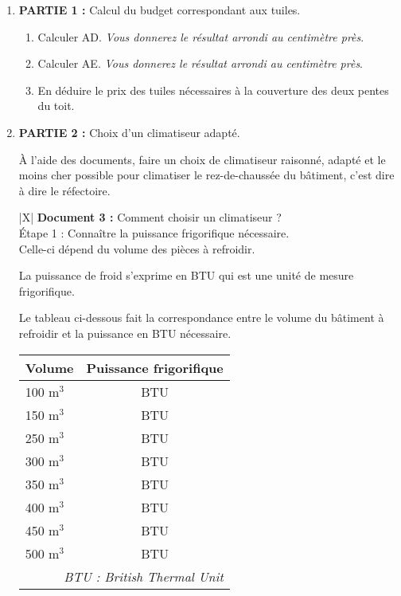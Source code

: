\begin{enumerate}
\item \textbf{PARTIE 1 :} Calcul du budget correspondant aux tuiles.
\smallskip

	\begin{enumerate}
		\item Calculer AD. \emph{Vous donnerez le résultat arrondi au centimètre près}.
		\item Calculer AE. \emph{Vous donnerez le résultat arrondi au centimètre près}.
		\item En déduire le prix des tuiles nécessaires à la couverture des deux pentes du toit.
 	\end{enumerate}
\item  \textbf{PARTIE 2 :} Choix d'un climatiseur adapté.
\smallskip

À l'aide des documents, faire un choix de climatiseur raisonné, adapté et le moins cher
possible pour climatiser le rez-de-chaussée du bâtiment, c'est dire à dire le réfectoire.
	
\begin{center}
\begin{tabularx}{\linewidth}{|X|}\hline	
\textbf{Document 3 :} Comment choisir un climatiseur ?\\[4pt]
Étape 1 : Connaître la puissance frigorifique nécessaire.\\[4pt]

Celle-ci dépend du volume des pièces à refroidir.

La puissance de froid s'exprime en BTU qui est une unité de mesure frigorifique.

Le tableau ci-dessous fait la correspondance entre le volume du bâtiment à refroidir et la
puissance en BTU nécessaire.

\begin{center}
\begin{tabular}{|m{2cm}|c|}\hline
Volume 		&Puissance frigorifique\\ \hline
100 m$^3$ 	&\np{12000} BTU\\ \hline
150 m$^3$ 	&\np{18000} BTU\\ \hline
250 m$^3$ 	&\np{25000} BTU\\ \hline
300 m$^3$ 	&\np{33000} BTU\\ \hline
350 m$^3$ 	&\np{41000} BTU\\ \hline
400 m$^3$ 	&\np{49000} BTU\\ \hline
450 m$^3$ 	&\np{56000} BTU\\ \hline
500 m$^3$ 	&\np{62000} BTU\\ \hline
\multicolumn{2}{r}{\hfill \footnotesize \emph{BTU : British Thermal Unit}}
\end{tabular}
\end{center}


\end{tabularx}
\end{center}
\end{enumerate}
